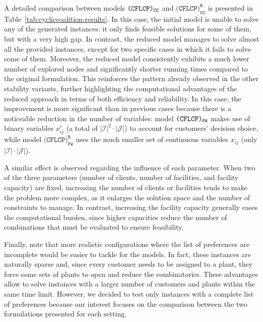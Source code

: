 \documentclass[preprint,11pt,authoryear]{elsarticle}
\newcommand\red[1]{{\color{red}#1}}
\def\J{\mathcal{J}}
\def\I{\mathcal{I}}
\begin{document}
A detailed comparison between models ${\normalfont\texttt{(CFLCP)}_{\texttt{CC}}}$ and $\texttt{(CFLCP)}_{\texttt{CC}}^\texttt{R}$ is presented in Table~\ref{tab:cycliccoalition-results}. In this case, the initial model is unable to solve any of the generated instances: it only finds feasible solutions for some of them, but with a very high gap. In contrast, the reduced model manages to solve almost all the provided instances, except for two specific cases in which it fails to solve some of them. Moreover, the reduced model consistently exhibits a much lower number of explored nodes and significantly shorter running times compared to the original formulation. This reinforces the pattern already observed in the other stability variants, further highlighting the computational advantages of the reduced approach in terms of both efficiency and reliability. In this case, the improvement is more significant than in previous cases because there is a noticeable reduction in the number of variables: model ${\normalfont\texttt{(CFLCP)}_{\texttt{PW}}}$ makes use of binary variables $x^r_{ij}$ (a total of $|\I|^2\cdot|\J|$) to account for customers' decision choice, while model $\texttt{(CFLCP)}_{\texttt{PW}}^\texttt{R}$ uses the much smaller set of continuous variables $x_{ij}$ (only $|\I|\cdot|\J|$).

A similar effect is observed regarding the influence of each parameter. When two of the three parameters (number of clients, number of facilities, and facility capacity) are fixed, increasing the number of clients or facilities tends to make the problem more complex, as it enlarges the solution space and the number of constraints to manage. In contrast, increasing the facility capacity generally eases the computational burden, since higher capacities reduce the number of combinations that must be evaluated to ensure feasibility.

Finally, note that more realistic configurations where the list of preferences are incomplete would be easier to tackle for the models. In fact, these instances are naturally sparse and, since every customer needs to be assigned to a plant, they force some sets of plants to open and reduce the combinatorics. These advantages allow to solve instances with a larger number of customers and plants within the same time limit. However, we decided to test only instances with a complete list of preferences because our interest focuses on the comparison between the two formulations presented for each setting.

\end{document}
